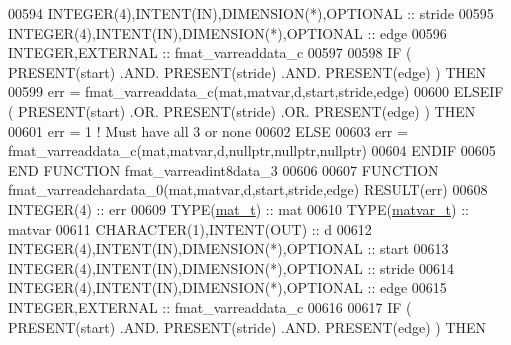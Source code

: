 \begin{DoxyCode}
00594     \textcolor{keywordtype}{INTEGER(4)},\textcolor{keywordtype}{INTENT(IN)},\textcolor{keywordtype}{DIMENSION(*)},\textcolor{keywordtype}{OPTIONAL}  :: stride
00595     \textcolor{keywordtype}{INTEGER(4)},\textcolor{keywordtype}{INTENT(IN)},\textcolor{keywordtype}{DIMENSION(*)},\textcolor{keywordtype}{OPTIONAL}  :: edge
00596     \textcolor{keywordtype}{INTEGER},\textcolor{keywordtype}{EXTERNAL}                             :: fmat\_varreaddata\_c
00597 
00598     \textcolor{keywordflow}{IF} ( \textcolor{keyword}{PRESENT}(start) .AND. \textcolor{keyword}{PRESENT}(stride) .AND. \textcolor{keyword}{PRESENT}(edge) ) \textcolor{keywordflow}{THEN}
00599         err = fmat\_varreaddata\_c(mat,matvar,d,start,stride,edge)
00600     \textcolor{keywordflow}{ELSEIF} ( \textcolor{keyword}{PRESENT}(start) .OR. \textcolor{keyword}{PRESENT}(stride) .OR. \textcolor{keyword}{PRESENT}(edge) ) \textcolor{keywordflow}{THEN}
00601         err = 1    \textcolor{comment}{! Must have all 3 or none}
00602     \textcolor{keywordflow}{ELSE}
00603         err = fmat\_varreaddata\_c(mat,matvar,d,nullptr,nullptr,nullptr)
00604 \textcolor{keywordflow}{    ENDIF}
00605 \textcolor{keyword}{END FUNCTION }fmat\_varreadint8data\_3
00606 
00607 \textcolor{keyword}{FUNCTION }fmat\_varreadchardata\_0(mat,matvar,d,start,stride,edge) \textcolor{keyword}{RESULT}(err)
00608     \textcolor{keywordtype}{INTEGER(4)}                                  :: err
00609     \textcolor{keywordtype}{TYPE}(\hyperlink{group___m_a_t_gab0fc888f5a5d79943b16284b1f91c2e8}{mat\_t})                                 :: mat
00610     \textcolor{keywordtype}{TYPE}(\hyperlink{group___m_a_t_structmatvar__t}{matvar\_t})                              :: matvar
00611     \textcolor{keywordtype}{CHARACTER(1)},\textcolor{keywordtype}{INTENT(OUT)}                    :: d
00612     \textcolor{keywordtype}{INTEGER(4)},\textcolor{keywordtype}{INTENT(IN)},\textcolor{keywordtype}{DIMENSION(*)},\textcolor{keywordtype}{OPTIONAL} :: start
00613     \textcolor{keywordtype}{INTEGER(4)},\textcolor{keywordtype}{INTENT(IN)},\textcolor{keywordtype}{DIMENSION(*)},\textcolor{keywordtype}{OPTIONAL} :: stride
00614     \textcolor{keywordtype}{INTEGER(4)},\textcolor{keywordtype}{INTENT(IN)},\textcolor{keywordtype}{DIMENSION(*)},\textcolor{keywordtype}{OPTIONAL} :: edge
00615     \textcolor{keywordtype}{INTEGER},\textcolor{keywordtype}{EXTERNAL}                            :: fmat\_varreaddata\_c
00616 
00617     \textcolor{keywordflow}{IF} ( \textcolor{keyword}{PRESENT}(start) .AND. \textcolor{keyword}{PRESENT}(stride) .AND. \textcolor{keyword}{PRESENT}(edge) ) \textcolor{keywordflow}{THEN}

\end{DoxyCode}

